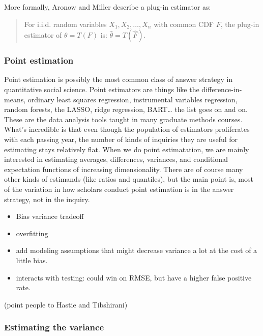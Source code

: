 \documentclass[
]{article}
\providecommand{\tightlist}{%
  \setlength{\itemsep}{0pt}\setlength{\parskip}{0pt}}
\begin{document}
More formally, Aronow and Miller describe a plug-in estimator as:

\begin{quote}
For i.i.d. random variables \(X_1, X_2, \ldots, X_n\) with common CDF
\(F\), the plug-in estimator of \(\theta = T(F)\) is:
\(\widehat\theta = T(\widehat F)\).
\end{quote}

\hypertarget{point-estimation}{%
\subsubsection{Point estimation}\label{point-estimation}}

Point estimation is possibly the most common class of answer strategy in
quantitative social science. Point estimators are things like the
difference-in-means, ordinary least squares regression, instrumental
variables regression, random forests, the LASSO, ridge regression,
BART\ldots{} the list goes on and on. These are the data analysis tools
taught in many graduate methods courses. What's incredible is that even
though the population of estimators proliferates with each passing year,
the number of kinds of inquiries they are useful for estimating stays
relatively flat. When we do point estimatation, we are mainly interested
in estimating averages, differences, variances, and conditional
expectation functions of increasing dimensionality. There are of course
many other kinds of estimands (like ratios and quantiles), but the main
point is, most of the variation in how scholars conduct point estimation
is in the answer strategy, not in the inquiry.

\begin{itemize}
\tightlist
\item
  Bias variance tradeoff
\item
  overfitting
\item
  add modeling assumptions that might decrease variance a lot at the
  cost of a little bias.
\item
  interacts with testing: could win on RMSE, but have a higher false
  positive rate.
\end{itemize}

(point people to Hastie and Tibshirani)

\hypertarget{estimating-the-variance}{%
\subsubsection{Estimating the variance}\label{estimating-the-variance}}
\end{document}
